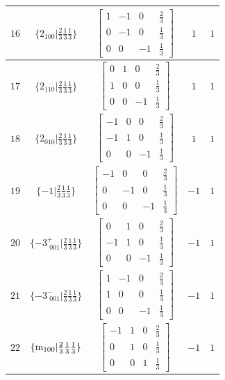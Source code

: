 \documentclass[fleqn,8pt]{jsarticle}
\begin{document}
\begin{longtable}{ccccc}
$ 16 $ & $ \{2{}_{100}|\frac{2}{3} \frac{1}{3} \frac{1}{3}\} $ & $ \begin{bmatrix} 1 & -1 & 0 & \frac{2}{3} \\ 0 & -1 & 0 & \frac{1}{3} \\ 0 & 0 & -1 & \frac{1}{3} \end{bmatrix} $ & $ 1 $ & $ 1 $ \\ \hline
$ 17 $ & $ \{2{}_{110}|\frac{2}{3} \frac{1}{3} \frac{1}{3}\} $ & $ \begin{bmatrix} 0 & 1 & 0 & \frac{2}{3} \\ 1 & 0 & 0 & \frac{1}{3} \\ 0 & 0 & -1 & \frac{1}{3} \end{bmatrix} $ & $ 1 $ & $ 1 $ \\ \hline
$ 18 $ & $ \{2{}_{010}|\frac{2}{3} \frac{1}{3} \frac{1}{3}\} $ & $ \begin{bmatrix} -1 & 0 & 0 & \frac{2}{3} \\ -1 & 1 & 0 & \frac{1}{3} \\ 0 & 0 & -1 & \frac{1}{3} \end{bmatrix} $ & $ 1 $ & $ 1 $ \\ \hline
$ 19 $ & $ \{-1|\frac{2}{3} \frac{1}{3} \frac{1}{3}\} $ & $ \begin{bmatrix} -1 & 0 & 0 & \frac{2}{3} \\ 0 & -1 & 0 & \frac{1}{3} \\ 0 & 0 & -1 & \frac{1}{3} \end{bmatrix} $ & $ -1 $ & $ 1 $ \\ \hline
$ 20 $ & $ \{-3^{+}_{\,\,001}|\frac{2}{3} \frac{1}{3} \frac{1}{3}\} $ & $ \begin{bmatrix} 0 & 1 & 0 & \frac{2}{3} \\ -1 & 1 & 0 & \frac{1}{3} \\ 0 & 0 & -1 & \frac{1}{3} \end{bmatrix} $ & $ -1 $ & $ 1 $ \\ \hline
$ 21 $ & $ \{-3^{-}_{\,\,001}|\frac{2}{3} \frac{1}{3} \frac{1}{3}\} $ & $ \begin{bmatrix} 1 & -1 & 0 & \frac{2}{3} \\ 1 & 0 & 0 & \frac{1}{3} \\ 0 & 0 & -1 & \frac{1}{3} \end{bmatrix} $ & $ -1 $ & $ 1 $ \\ \hline
$ 22 $ & $ \{{\rm m}_{100}|\frac{2}{3} \frac{1}{3} \frac{1}{3}\} $ & $ \begin{bmatrix} -1 & 1 & 0 & \frac{2}{3} \\ 0 & 1 & 0 & \frac{1}{3} \\ 0 & 0 & 1 & \frac{1}{3} \end{bmatrix} $ & $ -1 $ & $ 1 $ \\ \hline

\end{longtable}
\end{document}

